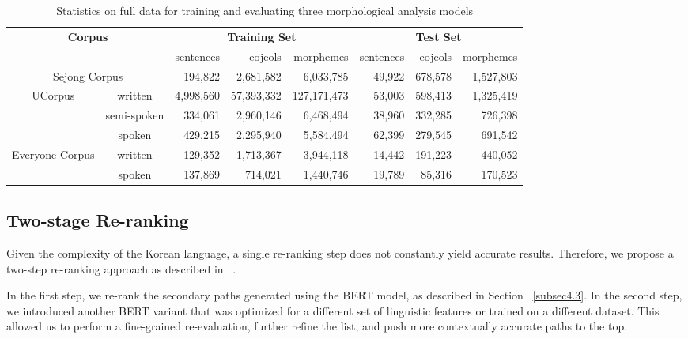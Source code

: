 \documentclass[AMS,STIX2COL]{WileyNJD-v2}
\begin{document}
    \begin{table}[]
        \caption{Statistics on full data for training and evaluating three morphological analysis models}\label{tab:data-statistics}
        \centering
        \begin{tabular*}{500pt}{@{\extracolsep\fill}|c|c|rrr|rrr|@{\extracolsep\fill}}
            \toprule
            \multicolumn{2}{|c|}{\multirow{2}{*}{\textbf{Corpus}}} & \multicolumn{3}{c|}{\textbf{Training Set}} & \multicolumn{3}{c|}{\textbf{Test Set}} \\
            \cmidrule{3-5} \cmidrule{6-8}
            \multicolumn{2}{|c|}{~} & sentences & eojeols & morphemes & sentences & eojeols & morphemes \\
            \midrule
            \multicolumn{2}{|c|}{Sejong Corpus} & 194,822 & 2,681,582 & 6,033,785 & 49,922 & 678,578 & 1,527,803 \\
            \midrule
            \multirow{3}{*}{UCorpus}         & written     & 4,998,560 & 57,393,332 & 127,171,473 & 53,003 & 598,413 & 1,325,419 \\
            ~                                & semi-spoken & 334,061   & 2,960,146  & 6,468,494   & 38,960 & 332,285 & 726,398   \\
            ~                                & spoken      & 429,215   & 2,295,940  & 5,584,494   & 62,399 & 279,545 & 691,542   \\
            \midrule
            \multirow{2}{*}{Everyone Corpus} & written     & 129,352   & 1,713,367  & 3,944,118   & 14,442 & 191,223 & 440,052   \\
            ~                                & spoken      & 137,869   & 714,021    & 1,440,746   & 19,789 & 85,316  & 170,523   \\
            \bottomrule
        \end{tabular*}
    \end{table}

    \subsection{Two-stage Re-ranking}\label{subsec4.4}

    Given the complexity of the Korean language, a single re-ranking step does not constantly yield accurate results. Therefore, we propose a two-step re-ranking approach as described in ~\cite{Nogueira2019}.

    In the first step, we re-rank the secondary paths generated using the BERT model, as described in Section ~\ref{subsec4.3}. In the second step, we introduced another BERT variant that was optimized for a different set of linguistic features or trained on a different dataset. This allowed us to perform a fine-grained re-evaluation, further refine the list, and push more contextually accurate paths to the top.
\end{document}

